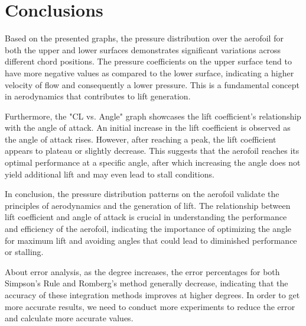 
\section{Conclusions}
\FloatBarrier %

Based on the presented graphs, the pressure distribution over the aerofoil for both the upper and lower surfaces demonstrates significant variations across different chord positions. The pressure coefficients on the upper surface tend to have more negative values as compared to the lower surface, indicating a higher velocity of flow and consequently a lower pressure. This is a fundamental concept in aerodynamics that contributes to lift generation.

Furthermore, the "CL vs. Angle" graph showcases the lift coefficient's relationship with the angle of attack. An initial increase in the lift coefficient is observed as the angle of attack rises. However, after reaching a peak, the lift coefficient appears to plateau or slightly decrease. This suggests that the aerofoil reaches its optimal performance at a specific angle, after which increasing the angle does not yield additional lift and may even lead to stall conditions.

In conclusion, the pressure distribution patterns on the aerofoil validate the principles of aerodynamics and the generation of lift. The relationship between lift coefficient and angle of attack is crucial in understanding the performance and efficiency of the aerofoil, indicating the importance of optimizing the angle for maximum lift and avoiding angles that could lead to diminished performance or stalling.

About error analysis, as the degree increases, the error percentages for both Simpson's Rule and Romberg's method generally decrease, indicating that the accuracy of these integration methods improves at higher degrees. In order to get more accurate results, we need to conduct more experiments to reduce the error and calculate more accurate values.

